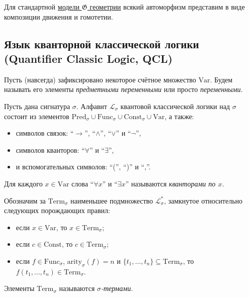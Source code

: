 \documentclass[12pt,a4paper]{article}
\newcommand{\Pred}{\ensuremath{\mathrm{Pred}}\xspace}
\newcommand{\Func}{\ensuremath{\mathrm{Func}}\xspace}
\newcommand{\Const}{\ensuremath{\mathrm{Const}}\xspace}
\newcommand{\arity}{\ensuremath{\mathrm{arity}}\xspace}
\newcommand{\Var}{\ensuremath{\mathrm{Var}}\xspace}
\newcommand{\Term}{\ensuremath{\mathrm{Term}}\xspace}
\begin{document}
    \begin{example}\label{G-structure-isomorphisms-example}
        Для стандартной \hyperlink{G-structure-definition}{модели $\mathfrak{G}$ геометрии} всякий автоморфизм представим в виде композиции движения и гомотетии.
    \end{example}

    \subsection{Язык кванторной классической логики\\(Quantifier Classic Logic, QCL)}

    \begin{definition}
        Пусть (навсегда) зафиксировано некоторое счётное множество \Var. Будем называть его элементы \emph{предметными переменными} или просто \emph{переменными}.

        Пусть дана сигнатура $\sigma$. Алфавит $\mathscr{L}_\sigma$ квантовой классической логики над $\sigma$ состоит из элементов $\Pred_\sigma \cup \Func_\sigma \cup \Const_\sigma \cup \Var$, а также:
        \begin{itemize}
            \item символов связок: ``$\rightarrow$'', ``$\wedge$'', ``$\vee$'' и ``$\neg$'',
            \item символов кванторов: ``$\forall$'' и ``$\exists$'',
            \item и вспомогательных символов: ``('', ``)'' и ``,''.
        \end{itemize}
        Для каждого $x \in \Var$ слова ``$\forall x$'' и ``$\exists x$'' называются \emph{кванторами по $x$}.

        Обозначим за $\Term_\sigma$ наименьшее подмножество $\mathscr{L}_\sigma^*$, замкнутое относительно следующих порождающих правил:
        \begin{itemize}
            \item если $x \in \Var$, то $x \in \Term_\sigma$;
            \item если $c \in \Const$, то $c \in \Term_\sigma$;
            \item если $f \in \Func_\sigma$, $\arity_\sigma(f) = n$ и $\{t_1, \dots, t_n\} \subseteq \Term_\sigma$, то $f(t_1, \dots, t_n) \in \Term_\sigma$.
        \end{itemize}
        Элементы $\Term_\sigma$ называются \emph{$\sigma$-термами}.
    \end{definition}
\end{document}
